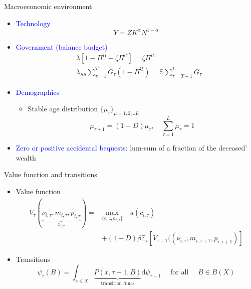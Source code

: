 \documentclass{beamer}
\begin{document}
\begin{frame}{Macroeconomic environment}
	\begin{itemize}
		\item \textcolor{blue}{Technology}
		\begin{equation*}
			Y = Z K^{\alpha}N^{1-\alpha}
		\end{equation*}
	\pause
		\item \textcolor{blue}{Government (balance budget)}
	\begin{equation*}
		\begin{split}
		\label{Eq:gov}
	&	\lambda \left[ 1-\Pi^\mho  + \zeta \Pi^\mho \right]  = \zeta \Pi^\mho    \\
	&	   \lambda_{SS} \sum^{T}_{\tau=1}G_{\tau}(1-\Pi^\mho) = \mathbb{S} \sum^{L}_{\tau=T+1} G_{\tau} 
	   \end{split}
	\end{equation*}
	
	\pause
		\item \textcolor{blue}{Demographics}
		\begin{itemize}
			\item Stable age distribution  $\{\mu_\tau \}_{\mu=1,2,..L}$ 
			\begin{equation*}
			 \mu_{\tau+1} = (1-D)\mu_{\tau}, \quad \sum^{L}_{\tau=1}\mu_{\tau} = 1
			\end{equation*}
		\end{itemize}
	\pause
		\item \textcolor{blue}{Zero or positive accidental bequests}:  lum-sum of a fraction of the deceased' wealth
	\end{itemize}
\end{frame}


\begin{frame}{Value function and transitions}
	\begin{itemize}
		\item Value function
		\begin{equation*}
			\begin{split}
				V_{\tau}(\underbrace{\nu_{i,\tau}, m_{i,\tau}, p_{i,\tau}}_{x_{i,\tau}})  =  & \underset{\{c_{i,\tau},a_{i,\tau}\}}{\textrm{max}} \quad   u(c_{i,\tau}) \\
		& +  (1-D)\beta \mathbb{E}_{\tau}\left[V_{\tau+1}((\nu_{i,\tau},m_{i,\tau+1}, p_{i,\tau+1})\right] 
			\end{split}
		\end{equation*}
	
	\item Transitions
		\begin{equation*}
		\label{Eq:DistDyn}
		\psi_{\tau}(B)=\int_{x \in X} \underbrace{P(x, \tau-1, B)}_{\text{transition funcs}}  \mathrm{d}\psi_{\tau-1} \quad \text { for all } \quad B\in B(X)
	\end{equation*}
	
	\end{itemize}
\end{frame}
\end{document}
